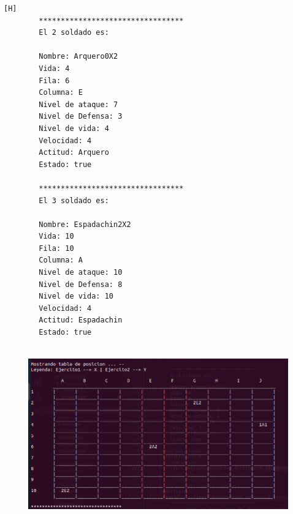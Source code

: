 \documentclass{article}
\begin{document}
\begin{lstlisting}[language=bash,caption={Ejecucion:}][H]
		*********************************
		El 2 soldado es: 
		
		Nombre: Arquero0X2
		Vida: 4
		Fila: 6
		Columna: E
		Nivel de ataque: 7
		Nivel de Defensa: 3
		Nivel de vida: 4
		Velocidad: 4
		Actitud: Arquero
		Estado: true
		
		*********************************
		El 3 soldado es: 
		
		Nombre: Espadachin2X2
		Vida: 10
		Fila: 10
		Columna: A
		Nivel de ataque: 10
		Nivel de Defensa: 8
		Nivel de vida: 10
		Velocidad: 4
		Actitud: Espadachin
		Estado: true
		
	\end{lstlisting}
	\begin{figure}[H]
		\centering
		\includegraphics[width=1.0\textwidth,keepaspectratio]{img/Commit9.png}
	\end{figure}
\end{document}
